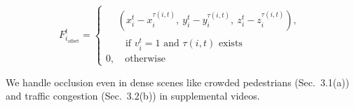 \vspace{-4.5ex}
\begin{equation*}
F_{i_{\text{offset}}}^t = 
\begin{cases}
    \begin{aligned}
    &(x_i^t - x_i^{\tau(i,t)},\ y_i^t - y_i^{\tau(i,t)},\ z_i^t - z_i^{\tau(i,t)}), 
    \end{aligned} \\
    \quad \quad \text{if } v_i^t = 1 \text{ and } \tau(i,t) \text{ exists} \\
    0,  \quad \text{otherwise}
\end{cases}
\end{equation*}





%



\vspace{-2ex}
We handle occlusion even in dense scenes like crowded pedestrians (Sec.~3.1(a)) and traffic congestion (Sec.~3.2(b)) in supplemental videos.













